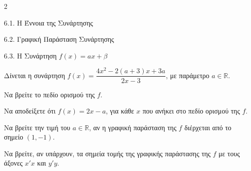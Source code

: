 \begin{ylh}{2}
    \item 6.1. Η Έννοια της Συνάρτησης
    \item 6.2. Γραφική Παράσταση Συνάρτησης
    \item 6.3. Η Συνάρτηση $f(x)=ax+\beta$
\end{ylh}
Δίνεται η συνάρτηση $f(x) = \dfrac{4x^2 - 2(a + 3)x + 3a}{2x - 3}$, με παράμετρο $a \in \mathbb{R}$.

\begin{alist}
\item Να βρείτε το πεδίο ορισμού της $f$. 
\item Να αποδείξετε ότι $f(x) = 2x - a$, για κάθε $x$ που ανήκει στο πεδίο ορισμού της $f$. 
\item Να βρείτε την τιμή του $a \in \mathbb{R}$, αν η γραφική παράσταση της $f$ διέρχεται από το σημείο $(1, -1)$. 
\item Να βρείτε, αν υπάρχουν, τα σημεία τομής της γραφικής παράστασης της $f$ με τους άξονες $x'x$ και $y'y$. 
\end{alist}

